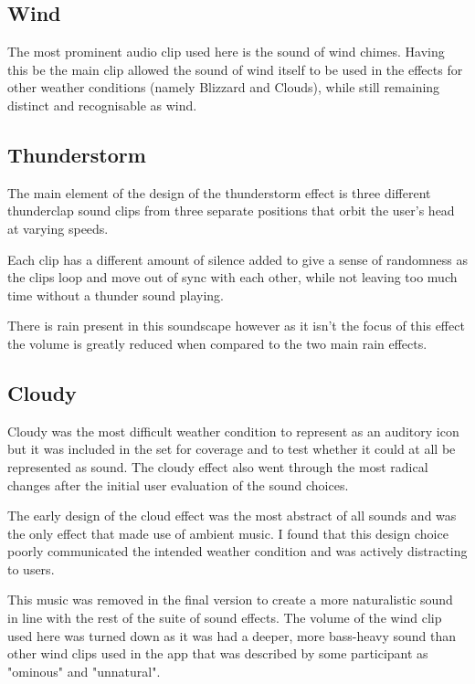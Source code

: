 \documentclass{l4proj}
\begin{document}
\subsection{Wind}
The most prominent audio clip used here is the sound of wind chimes. Having this be the main clip allowed the sound of wind itself to be used in the effects for other weather conditions (namely Blizzard and Clouds), while still remaining distinct and recognisable as wind.

\subsection{Thunderstorm}

The main element of the design of the thunderstorm effect is three different thunderclap sound clips from three separate positions that orbit the user's head at varying speeds.

Each clip has a different amount of silence added to give a sense of randomness as the clips loop and move out of sync with each other, while not leaving too much time without a thunder sound playing.

There is rain present in this soundscape however as it isn't the focus of this effect the volume is greatly reduced when compared to the two main rain effects.

\subsection{Cloudy}

Cloudy was the most difficult weather condition to represent as an auditory icon but it was included in the set for coverage and to test whether it could at all be represented as sound. The cloudy effect also went through the most radical changes after the initial user evaluation of the sound choices.

The early design of the cloud effect was the most abstract of all sounds and was the only effect that made use of ambient music. 
I found that this design choice poorly communicated the intended weather condition and was actively distracting to users.

This music was removed in the final version to create a more naturalistic sound in line with the rest of the suite of sound effects. The volume of the wind clip used here was turned down as it was had a deeper, more bass-heavy sound than other wind clips used in the app that was described by some participant as "ominous" and "unnatural".
\end{document}
